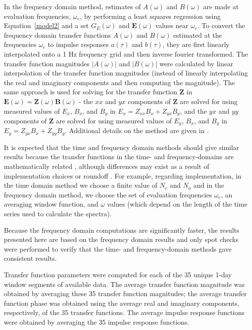 \documentclass[draft,linenumbers]{agujournal2018}
\begin{document}
In the frequency domain method, estimates of $A(\omega)$ and $B(\omega)$ are made at evaluation frequencies, $\omega_e$, by performing a least squares regression using Equation~\ref{model2} and a set $G_E(\omega)$ and $\mathbf{E}(\omega)$ values near $\omega_e$. To convert the frequency domain transfer functions $A(\omega)$ and $B(\omega)$ estimated at the frequencies $\omega_e$ to impulse responses $a(\tau)$ and $b(\tau)$, they are first linearly interpolated onto a 1 Hz frequency grid and then inverse fourier transformed. The transfer function magnitudes $|A(\omega)|$ and $|B(\omega)|$ were calculated by linear interpolation of the transfer function magnitudes (instead of linearly interpolating the real and imaginary components and then computing the magnitude). The same approach is used for solving for the transfer function $\mathbf{Z}$ in $\mathbf{E}(\omega) = \mathbf{Z}(\omega)\mathbf{B}(\omega)$ - the $xx$ and $yx$ components of $\mathbf{Z}$ are solved for using measured values of $E_x$, $B_x$, and $B_y$ in $E_x = Z_{xx}B_x + Z_{yx}B_{y}$, and the $yx$ and $yy$ components of $\mathbf{Z}$ are solved for using measured values of $E_y$, $B_x$, and $B_y$ in $E_y = Z_{yx}B_x + Z_{yy}B_y$. Additional details on the method are given in \cite[][and references therein.]{Weigel2017}.

It is expected that the time and frequency domain methods should give similar results because the transfer functions in the time- and frequency-domains are mathematically related \citep{Schoukens2004,Ljung2007}, although differences may exist as a result of implementation choices or roundoff \citep{Ljung2004}.  For example, regarding implementation, in the time domain method we choose a finite value of $N_c$ and $N_a$ and in the frequency domain method, we choose the set of evaluation frequencies $\omega_e$, an averaging window function, and $\omega$ values (which depend on the length of the time series used to calculate the spectra).

Because the frequency domain computations are significantly faster, the results presented here are based on the frequency domain results and only spot checks were performed to verify that the time- and frequency-domain methods gave consistent results.

Transfer function parameters were computed for each of the 35 unique 1-day window segments of available data. The average transfer function magnitude was obtained by averaging these 35 transfer function magnitudes; the average transfer function phase was obtained using the average real and imaginary components, respectively, of the 35 transfer functions. The average impulse response functions were obtained by averaging the 35 impulse response functions.
\end{document}

